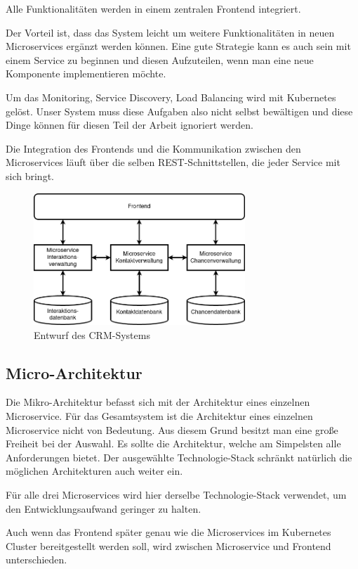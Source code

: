 Alle Funktionalitäten werden in einem zentralen Frontend integriert.

Der Vorteil ist, dass das System leicht um weitere Funktionalitäten in neuen Microservices ergänzt werden können. Eine gute Strategie kann es auch sein mit einem Service zu beginnen und diesen Aufzuteilen, wenn man eine neue Komponente implementieren möchte.

Um das Monitoring, Service Discovery, Load Balancing wird mit Kubernetes gelöst. Unser System muss diese Aufgaben also nicht selbst bewältigen und diese Dinge können für diesen Teil der Arbeit ignoriert werden.

Die Integration des Frontends und die Kommunikation zwischen den Microservices läuft über die selben REST-Schnittstellen, die jeder Service mit sich bringt.

\begin{figure}[H] 
    \centering
    \includegraphics[width=0.71\textwidth]{figures/CRMEntwurf.png}
    \caption{Entwurf des \acp{CRM-System}}
\end{figure}

\subsection{Micro-Architektur}

Die Mikro-Architektur befasst sich mit der Architektur eines einzelnen Microservice. Für das Gesamtsystem ist die Architektur eines einzelnen Microservice nicht von Bedeutung. Aus diesem Grund besitzt man eine große Freiheit bei der Auswahl. Es sollte die Architektur, welche am Simpelsten alle Anforderungen bietet. Der ausgewählte Technologie-Stack schränkt natürlich die möglichen Architekturen auch weiter ein.

Für alle drei Microservices wird hier derselbe Technologie-Stack verwendet, um den Entwicklungsaufwand geringer zu halten.

Auch wenn das Frontend später genau wie die Microservices im Kubernetes Cluster bereitgestellt werden soll, wird zwischen Microservice und Frontend unterschieden.

